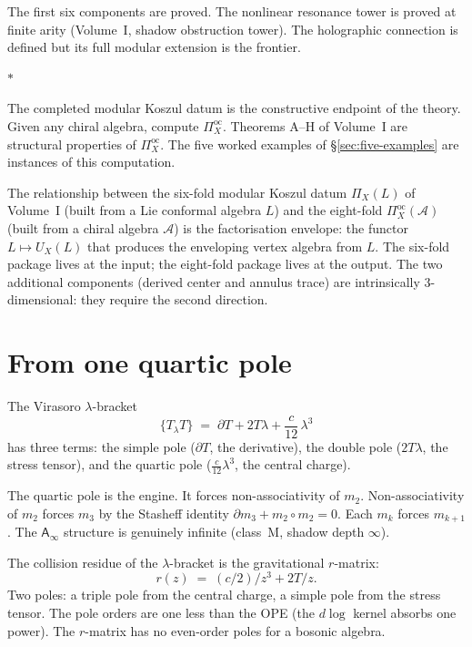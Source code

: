 \documentclass[11pt]{article}
\newcommand{\cA}{\mathcal{A}}
\newcommand{\Ainf}{\mathsf{A}_{\infty}}
\newcommand{\sep}{\bigskip\begin{center}$*$\end{center}\medskip}
\begin{document}
\medskip

The first six components are proved.  The nonlinear resonance
tower is proved at finite arity (Volume~I, shadow obstruction tower).
The holographic connection is defined but its full modular
extension is the frontier.

\sep

The completed modular Koszul datum is the constructive endpoint of the
theory.  Given any chiral algebra, compute $\Pi^{\mathrm{oc}}_X$.
Theorems A--H of Volume~I are structural properties of
$\Pi^{\mathrm{oc}}_X$.  The five worked examples of
\S\ref{sec:five-examples} are instances of this computation.

The relationship between the six-fold modular Koszul datum $\Pi_X(L)$
of Volume~I (built from a Lie conformal algebra $L$) and the
eight-fold $\Pi^{\mathrm{oc}}_X(\cA)$ (built from a chiral
algebra $\cA$) is the factorisation envelope: the functor
$L \mapsto U_X(L)$ that produces the enveloping vertex algebra
from $L$.  The six-fold package lives at the input; the
eight-fold package lives at the output.  The two additional
components (derived center and annulus trace) are intrinsically
$3$-dimensional: they require the second direction.


\section{From one quartic pole}
\label{sec:one-quartic-pole}

The Virasoro $\lambda$-bracket
\[
\{T{}_\lambda T\}
\;=\;
\partial T + 2T\lambda + \frac{c}{12}\,\lambda^3
\]
has three terms: the simple pole ($\partial T$, the derivative),
the double pole ($2T\lambda$, the stress tensor), and the
quartic pole ($\frac{c}{12}\lambda^3$, the central charge).

The quartic pole is the engine.  It forces non-associativity of
$m_2$.  Non-associativity of $m_2$ forces $m_3$ by the Stasheff
identity $\partial m_3 + m_2 \circ m_2 = 0$.  Each $m_k$ forces
$m_{k+1}$.  The $\Ainf$ structure is genuinely infinite (class~M,
shadow depth $\infty$).

The collision residue of the $\lambda$-bracket is the gravitational
$r$-matrix:
\[
r(z) \;=\; (c/2)/z^3 + 2T/z.
\]
Two poles: a triple pole from the central charge, a simple pole from
the stress tensor.  The pole orders are one less than the OPE (the
$d\log$ kernel absorbs one power).  The $r$-matrix has no
even-order poles for a bosonic algebra.
\end{document}
